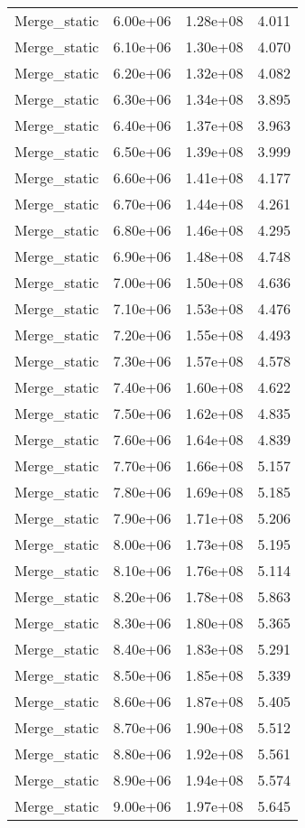 \begin{table}
\begin{tabular}{llll}
Merge_static & 6.00e+06 & 1.28e+08 & 4.011 \\
Merge_static & 6.10e+06 & 1.30e+08 & 4.070 \\
Merge_static & 6.20e+06 & 1.32e+08 & 4.082 \\
Merge_static & 6.30e+06 & 1.34e+08 & 3.895 \\
Merge_static & 6.40e+06 & 1.37e+08 & 3.963 \\
Merge_static & 6.50e+06 & 1.39e+08 & 3.999 \\
Merge_static & 6.60e+06 & 1.41e+08 & 4.177 \\
Merge_static & 6.70e+06 & 1.44e+08 & 4.261 \\
Merge_static & 6.80e+06 & 1.46e+08 & 4.295 \\
Merge_static & 6.90e+06 & 1.48e+08 & 4.748 \\
Merge_static & 7.00e+06 & 1.50e+08 & 4.636 \\
Merge_static & 7.10e+06 & 1.53e+08 & 4.476 \\
Merge_static & 7.20e+06 & 1.55e+08 & 4.493 \\
Merge_static & 7.30e+06 & 1.57e+08 & 4.578 \\
Merge_static & 7.40e+06 & 1.60e+08 & 4.622 \\
Merge_static & 7.50e+06 & 1.62e+08 & 4.835 \\
Merge_static & 7.60e+06 & 1.64e+08 & 4.839 \\
Merge_static & 7.70e+06 & 1.66e+08 & 5.157 \\
Merge_static & 7.80e+06 & 1.69e+08 & 5.185 \\
Merge_static & 7.90e+06 & 1.71e+08 & 5.206 \\
Merge_static & 8.00e+06 & 1.73e+08 & 5.195 \\
Merge_static & 8.10e+06 & 1.76e+08 & 5.114 \\
Merge_static & 8.20e+06 & 1.78e+08 & 5.863 \\
Merge_static & 8.30e+06 & 1.80e+08 & 5.365 \\
Merge_static & 8.40e+06 & 1.83e+08 & 5.291 \\
Merge_static & 8.50e+06 & 1.85e+08 & 5.339 \\
Merge_static & 8.60e+06 & 1.87e+08 & 5.405 \\
Merge_static & 8.70e+06 & 1.90e+08 & 5.512 \\
Merge_static & 8.80e+06 & 1.92e+08 & 5.561 \\
Merge_static & 8.90e+06 & 1.94e+08 & 5.574 \\
Merge_static & 9.00e+06 & 1.97e+08 & 5.645 \\

\end{tabular}
\end{table}

